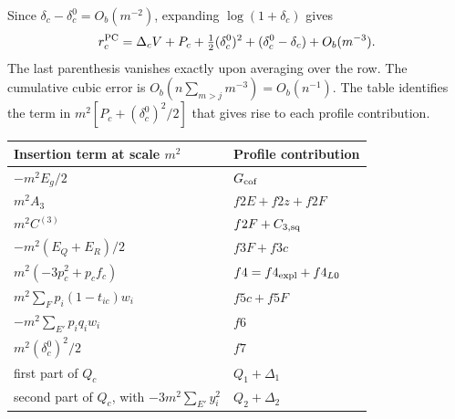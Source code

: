 

Since \(\delta_c-\delta_c^0=O_b(m^{-2})\), expanding \(\log(1+\delta_c)\) gives \[
 r_c^{\rm PC}=\Delta_c V+P_c+\tfrac12(\delta_c^0)^2
                   +(\delta_c^0-\delta_c)+O_b(m^{-3}).
\] The last parenthesis vanishes exactly upon averaging over the row. The cumulative cubic error is
\(O_b(n\sum_{m>j}m^{-3})=O_b(n^{-1})\). The table identifies the term in \(m^2[P_c+(\delta_c^0)^2/2]\)
that gives rise to each profile contribution. \begin{center}\small \begin{tabular}{ll} \toprule Insertion
term at scale \(m^2\) & Profile contribution\\ \midrule \(-m^2 E_g/2\)& \(G_{\rm cof}\)\\ \(m^2
A_3\)&\(f2E+f2z+f2F\)\\ \(m^2 C^{(3)}\)&\(f2F+C_{3,\rm sq}\)\\ \(-m^2(E_Q+E_R)/2\)&\(f3F+f3c\)\\
\(m^2(-3p_c^2+p_c f_c)\)&\(f4=f4_{\rm expl}+f4_{L0}\)\\ \(m^2\sum_F p_i(1-t_{ic})w_i\)&\(f5c+f5F\)\\
\(-m^2\sum_{E'}p_iq_iw_i\)&\(f6\)\\ \(m^2(\delta_c^0)^2/2\)&\(f7\)\\ first part of
\(Q_c\)&\(Q_1+\Delta_1\)\\ second part of \(Q_c\), with \(-3m^2\sum_{E'}y_i^2\)&\(Q_2+\Delta_2\)\\
\bottomrule \end{tabular} \end{center}  
